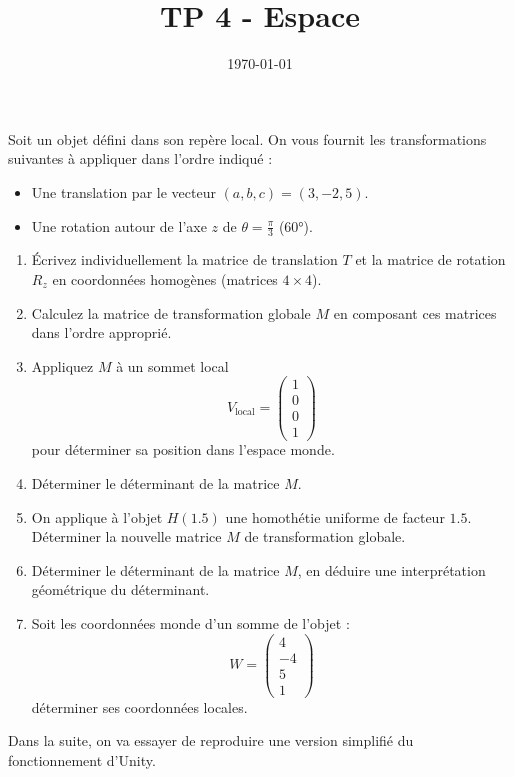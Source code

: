 \documentclass[a4paper,12pt]{article}
\title{TP 4 - Espace}
\author{}
\date{\today}
\begin{document}
\makeonlytitle


\label{exo:theorique}


Soit un objet défini dans son repère local. On vous fournit les transformations suivantes à appliquer dans l'ordre indiqué :

\begin{itemize}
  \item Une translation par le vecteur \((a, b, c) = (3, -2, 5)\).
  \item Une rotation autour de l'axe \(z\) de \(\theta = \frac{\pi}{3}\) (60°).
\end{itemize}

\begin{enumerate}
  \item Écrivez individuellement la matrice de translation \(T\) et la matrice de rotation \(R_z\) en coordonnées homogènes (matrices \(4 \times 4\)).
  \item Calculez la matrice de transformation globale \(M\) en composant ces matrices dans l'ordre approprié.
  \item Appliquez \(M\) à un sommet local 
  \[
  V_{\text{local}} = \begin{pmatrix} 1 \\ 0 \\ 0 \\ 1 \end{pmatrix}
  \]
  pour déterminer sa position dans l'espace monde.
  \item Déterminer le déterminant de la matrice $M$.
  \item On applique à l'objet \(H(1.5)\) une homothétie uniforme de facteur $1.5$. Déterminer la nouvelle matrice $M$ de transformation globale.
  \item Déterminer le déterminant de la matrice $M$, en déduire une interprétation géométrique du déterminant.
  \item Soit les coordonnées monde d'un somme de l'objet :  
  \[
  W = \begin{pmatrix} 4 \\ -4 \\ 5 \\ 1 \end{pmatrix}
  \]
  déterminer ses coordonnées locales.
\end{enumerate}


\label{exo:impl}

Dans la suite, on va essayer de reproduire une version simplifié du fonctionnement d'Unity. 
\end{document}
